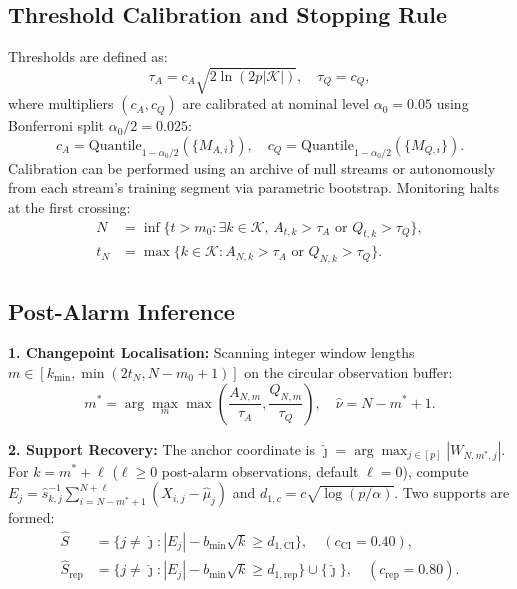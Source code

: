 \documentclass[lettersize,journal]{IEEEtran}
\begin{document}
\subsection{Threshold Calibration and Stopping Rule}
Thresholds are defined as:
\begin{equation}
    \tau_A = c_A \sqrt{2 \ln(2p|\mathcal{K}|)}, \quad \tau_Q = c_Q, \label{eq:thresholds}
\end{equation}
where multipliers $(c_A, c_Q)$ are calibrated at nominal level $\alpha_0 = 0.05$ using Bonferroni split $\alpha_0/2 = 0.025$:
\begin{equation}
    c_A = \text{Quantile}_{1 - \alpha_0/2}(\{M_{A,i}\}), \quad c_Q = \text{Quantile}_{1 - \alpha_0/2}(\{M_{Q,i}\}). \label{eq:calib}
\end{equation}
Calibration can be performed using an archive of null streams or autonomously from each stream's training segment via parametric bootstrap. Monitoring halts at the first crossing:
\begin{align}
    N &= \inf\{t > m_0 : \exists k \in \mathcal{K},\, A_{t,k} > \tau_A \text{ or } Q_{t,k} > \tau_Q\}, \label{eq:stop} \\
    t_N &= \max\{k \in \mathcal{K} : A_{N,k} > \tau_A \text{ or } Q_{N,k} > \tau_Q\}. \label{eq:tN}
\end{align}

\subsection{Post-Alarm Inference}
\textbf{1. Changepoint Localisation:} Scanning integer window lengths $m \in [k_{\min}, \min(2t_N, N - m_0 + 1)]$ on the circular observation buffer:
\begin{equation}
    m^* = \arg\max_m \max\left( \frac{A_{N,m}}{\tau_A}, \frac{Q_{N,m}}{\tau_Q} \right), \quad \hat{\nu} = N - m^* + 1. \label{eq:mstar}
\end{equation}

\textbf{2. Support Recovery:} The anchor coordinate is $\hat{\jmath} = \arg\max_{j \in [p]} |W_{N,m^*,j}|$. For $k = m^* + \ell$ ($\ell \ge 0$ post-alarm observations, default $\ell = 0$), compute $E_j = \hat{s}_{k,j}^{-1} \sum_{i=N-m^*+1}^{N+\ell} (X_{i,j} - \hat{\mu}_j)$ and $d_{1,c} = c \sqrt{\log(p/\alpha)}$. Two supports are formed:
\begin{align}
    \hat{S} &= \{j \neq \hat{\jmath} : |E_j| - b_{\min}\sqrt{k} \ge d_{1,\text{CI}}\}, \quad (c_{\text{CI}} = 0.40), \label{eq:S_ci} \\
    \hat{S}_{\text{rep}} &= \{j \neq \hat{\jmath} : |E_j| - b_{\min}\sqrt{k} \ge d_{1,\text{rep}}\} \cup \{\hat{\jmath}\}, \quad (c_{\text{rep}} = 0.80). \label{eq:S_rep}
\end{align}
\end{document}
